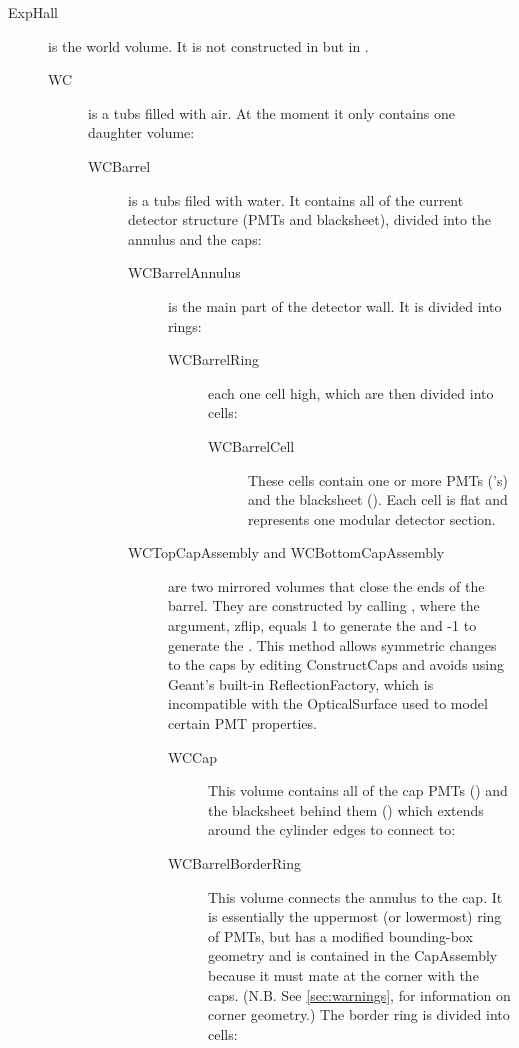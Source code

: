 \begin{description}
  \item[ExpHall] is the world volume. It is not constructed in   but in .
  \begin{description}
    \item[WC] is a tubs filled with air. At the moment it  only contains one daughter volume:
    \begin{description}
      \item[WCBarrel] is a tubs filed with water. It contains all of the current detector structure (PMTs and blacksheet), divided into the annulus and the caps:
      \begin{description}
        \item[WCBarrelAnnulus] is the main part of the detector wall. It is divided into rings:
        \begin{description}
          \item[WCBarrelRing] each one cell high, which are then divided into cells:
          \begin{description}
            \item[WCBarrelCell] These cells contain one or more PMTs ('s) and the blacksheet ().  Each cell is flat and represents one modular detector section.
          \end{description}
        \end{description}
        \item[WCTopCapAssembly and WCBottomCapAssembly] are two mirrored volumes that close the ends of the barrel.  They are constructed by calling , where the argument, zflip, equals 1 to generate the  and -1 to generate the .  This method allows symmetric changes to the caps by editing ConstructCaps and avoids using Geant's built-in ReflectionFactory, which is incompatible with the OpticalSurface used to model certain PMT properties.
        \begin{description}
          \item[WCCap] This volume contains all of the cap PMTs () and the blacksheet behind them () which extends around the cylinder edges to connect to:
          \item[WCBarrelBorderRing] This volume connects the annulus to the cap.  It is essentially the uppermost (or lowermost) ring of PMTs, but has a modified  bounding-box geometry and is contained in the CapAssembly because it must mate at the corner with the caps.  (N.B.  See \ref{sec:warnings}, for information on corner geometry.)  The border ring is divided into cells:

\end{description}
\end{description}
\end{description}
\end{description}
\end{description}
